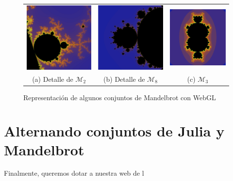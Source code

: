 \begin{figure}[ht]
    \centering
    \begin{tabular}{ccc}
      \includegraphics[scale=0.23]{img/C6/mandelbrot-1.png} &   \includegraphics[scale=0.23]{img/C6/mandelbrot-2.png} &   \includegraphics[scale=0.23]{img/C6/mandelbrot-3.png} \\
    (a) Detalle de $\mathcal{M}_2$ & (b) Detalle de $\mathcal{M}_8$ & (c) $\mathcal{M}_3$ \\[6pt]
    \end{tabular}
    \caption{Representación de algunos conjuntos de Mandelbrot con WebGL}
    \label{fig:mandelbrot-webgl}
\end{figure}

\section{Alternando conjuntos de Julia y Mandelbrot}
\label{section:alternando}

Finalmente, queremos dotar a nuestra web de l